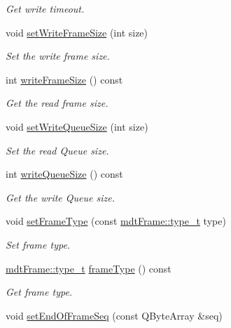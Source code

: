 \begin{DoxyCompactItemize}
\begin{DoxyCompactList}\small\item\em Get write timeout. \end{DoxyCompactList}\item 
void \hyperlink{classmdt_port_config_a9539cef9e33d564c7c70902a6380be04}{setWriteFrameSize} (int size)
\begin{DoxyCompactList}\small\item\em Set the write frame size. \end{DoxyCompactList}\item 
int \hyperlink{classmdt_port_config_a19bda9f9ce29657179994e02c6da11b9}{writeFrameSize} () const 
\begin{DoxyCompactList}\small\item\em Get the read frame size. \end{DoxyCompactList}\item 
void \hyperlink{classmdt_port_config_a8a99771f7acfeb546d1d89d3671407e5}{setWriteQueueSize} (int size)
\begin{DoxyCompactList}\small\item\em Set the read Queue size. \end{DoxyCompactList}\item 
int \hyperlink{classmdt_port_config_a93d72b1ea53f188d7a35bc044394b959}{writeQueueSize} () const 
\begin{DoxyCompactList}\small\item\em Get the write Queue size. \end{DoxyCompactList}\item 
void \hyperlink{classmdt_port_config_a627adcb87d26757238f844db19fc248d}{setFrameType} (const \hyperlink{classmdt_frame_af936e37d5fe4c066c0fb0161fafd4a17}{mdtFrame::type\_\-t} type)
\begin{DoxyCompactList}\small\item\em Set frame type. \end{DoxyCompactList}\item 
\hyperlink{classmdt_frame_af936e37d5fe4c066c0fb0161fafd4a17}{mdtFrame::type\_\-t} \hyperlink{classmdt_port_config_af9c95090820c449412298832582a0fab}{frameType} () const 
\begin{DoxyCompactList}\small\item\em Get frame type. \end{DoxyCompactList}\item 
\hypertarget{classmdt_port_config_a3c5e1c444a18da7d68430bd1c14030f4}{
void \hyperlink{classmdt_port_config_a3c5e1c444a18da7d68430bd1c14030f4}{setEndOfFrameSeq} (const QByteArray \&seq)}
\label{classmdt_port_config_a3c5e1c444a18da7d68430bd1c14030f4}


\end{DoxyCompactItemize}

